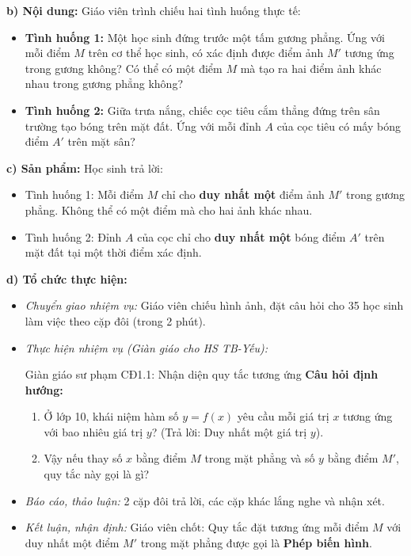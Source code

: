 \documentclass[12pt, a4paper]{article}
\begin{document}
\textbf{b) Nội dung:} Giáo viên trình chiếu hai tình huống thực tế:
\begin{itemize}[leftmargin=0.6cm]
    \item \textbf{Tình huống 1:} Một học sinh đứng trước một tấm gương phẳng. Ứng với mỗi điểm $M$ trên cơ thể học sinh, có xác định được điểm ảnh $M'$ tương ứng trong gương không? Có thể có một điểm $M$ mà tạo ra hai điểm ảnh khác nhau trong gương phẳng không?
    \item \textbf{Tình huống 2:} Giữa trưa nắng, chiếc cọc tiêu cắm thẳng đứng trên sân trường tạo bóng trên mặt đất. Ứng với mỗi đỉnh $A$ của cọc tiêu có mấy bóng điểm $A'$ trên mặt sân?
\end{itemize}

\textbf{c) Sản phẩm:} Học sinh trả lời:
\begin{itemize}[leftmargin=0.6cm]
    \item Tình huống 1: Mỗi điểm $M$ chỉ cho \textbf{duy nhất một} điểm ảnh $M'$ trong gương phẳng. Không thể có một điểm mà cho hai ảnh khác nhau.
    \item Tình huống 2: Đỉnh $A$ của cọc chỉ cho \textbf{duy nhất một} bóng điểm $A'$ trên mặt đất tại một thời điểm xác định.
\end{itemize}

\textbf{d) Tổ chức thực hiện:}
\begin{itemize}[leftmargin=0.6cm]
    \item \textit{Chuyển giao nhiệm vụ:} Giáo viên chiếu hình ảnh, đặt câu hỏi cho 35 học sinh làm việc theo cặp đôi (trong 2 phút).
    \item \textit{Thực hiện nhiệm vụ (Giàn giáo cho HS TB-Yếu):}
    \begin{scaffoldbox}{Giàn giáo sư phạm CĐ1.1: Nhận diện quy tắc tương ứng}
        \textbf{Câu hỏi định hướng:}
        \begin{enumerate}[leftmargin=0.5cm]
            \item Ở lớp 10, khái niệm hàm số $y = f(x)$ yêu cầu mỗi giá trị $x$ tương ứng với bao nhiêu giá trị $y$? (Trả lời: Duy nhất một giá trị $y$).
            \item Vậy nếu thay số $x$ bằng điểm $M$ trong mặt phẳng và số $y$ bằng điểm $M'$, quy tắc này gọi là gì?
        \end{enumerate}
    \end{scaffoldbox}
    \item \textit{Báo cáo, thảo luận:} 2 cặp đôi trả lời, các cặp khác lắng nghe và nhận xét.
    \item \textit{Kết luận, nhận định:} Giáo viên chốt: Quy tắc đặt tương ứng mỗi điểm $M$ với duy nhất một điểm $M'$ trong mặt phẳng được gọi là \textbf{Phép biến hình}.
\end{itemize}
\end{document}
